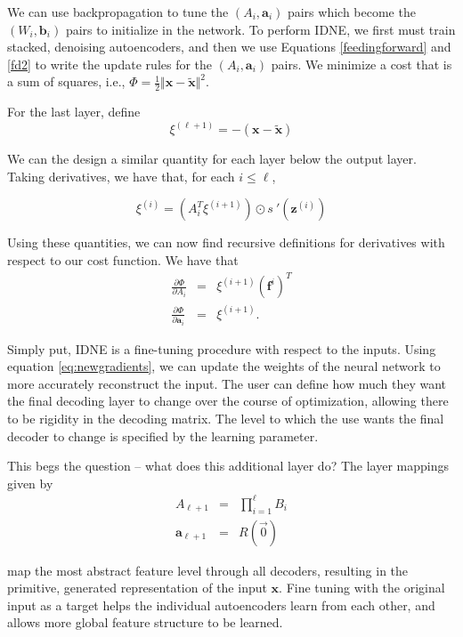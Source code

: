 We can use backpropagation to tune the $(A_i, \mathbf{a}_i)$ pairs which become the $(W_i, \mathbf{b}_i)$ pairs to initialize in the network. To perform IDNE, we first must train stacked, denoising autoencoders, and then we use Equations \eqref{feedingforward} and \eqref{fd2} to write the update rules for the $(A_i, \mathbf{a}_i)$ pairs. We minimize a cost that is a sum of squares, i.e., $\Phi = \frac{1}{2}\Vert \mathbf{x} - \tilde{\mathbf{x}} \Vert ^2 $.

For the last layer, define
\begin{equation}
\label{eq:finallayer}
\xi^{(\ell+1)} = -(\mathbf{x} - \tilde{\mathbf{x}})
\end{equation}

We can the design a similar quantity for each layer below the output layer. Taking derivatives, we have that, for each $i\leq \ell$,

\begin{equation}
\label{update1}
\xi^{(i)} = (A_i^T\xi^{(i+1)})\odot s\:'(\mathbf{z}^{(i)})
\end{equation}

Using these quantities, we can now find recursive definitions for derivatives with respect to our cost function. We have that 
\begin{eqnarray}
\label{eq:newgradients}
\frac{\partial\Phi}{\partial A_i} &=& \xi^{(i+1)}(\mathbf{f}^{i})^T\\
\frac{\partial\Phi}{\partial \mathbf{a}_i} &=& \xi^{(i+1)}.
\end{eqnarray}


Simply put, IDNE is a fine-tuning procedure with respect to the inputs. Using equation \eqref{eq:newgradients}, we can update the weights of the neural network to more accurately reconstruct the input. The user can define how much they want the final decoding layer to change over the course of optimization, allowing there to be rigidity in the decoding matrix. The level to which the use wants the final decoder to change is specified by the learning parameter.

This begs the question -- what does this additional layer do? The layer mappings given by 
\begin{eqnarray}
A_{\ell+1} &=& \prod_{i=1}^{\ell} B_i \\ 
\mathbf{a}_{\ell+1} &=& R(\overrightarrow{0})
\end{eqnarray}

map the most abstract feature level through all decoders, resulting in the primitive, generated representation of the input $\mathbf{x}$. Fine tuning with the original input as a target helps the individual autoencoders learn from each other, and allows more global feature structure to be learned.


